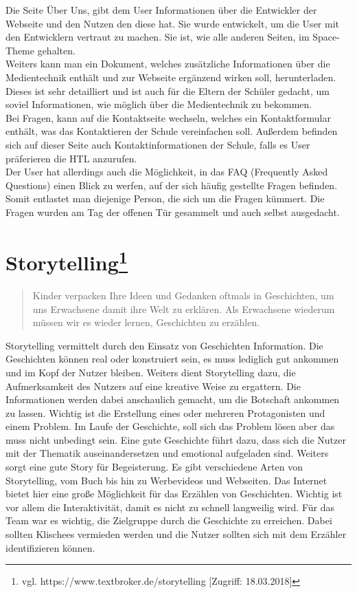 Die Seite Über Uns, gibt dem User Informationen über die Entwickler der Webseite und den Nutzen den diese hat. Sie wurde entwickelt, um die User mit den Entwicklern vertraut zu machen. Sie ist, wie alle anderen Seiten, im Space-Theme gehalten. 
\\

Weiters kann man ein Dokument, welches zusätzliche Informationen über die Medientechnik enthält und zur Webseite ergänzend wirken soll, herunterladen. Dieses ist sehr detailliert und ist auch für die Eltern der Schüler gedacht, um soviel Informationen, wie möglich über die Medientechnik zu bekommen. 
\\
Bei Fragen, kann auf die Kontaktseite wechseln, welches ein Kontaktformular enthält, was das Kontaktieren der Schule vereinfachen soll. Außerdem befinden sich auf dieser Seite auch Kontaktinformationen der Schule, falls es User präferieren die HTL anzurufen.\\

Der User hat allerdings auch die Möglichkeit, in das FAQ (Frequently Asked Questions) einen Blick zu werfen, auf der sich häufig gestellte Fragen befinden. Somit entlastet man diejenige Person, die sich um die Fragen kümmert. Die Fragen wurden am Tag der offenen Tür gesammelt und auch selbst ausgedacht. 


\section[Storytelling]{Storytelling\protect\footnote{\label{foot:2}vgl. https://www.textbroker.de/storytelling [Zugriff: 18.03.2018]}}

\begin{quote}
Kinder verpacken Ihre Ideen und Gedanken oftmals in Geschichten, um uns Erwachsene damit ihre Welt zu erklären. Als Erwachsene wiederum müssen wir es wieder lernen, Geschichten zu erzählen.
\end{quote}
Storytelling vermittelt durch den Einsatz von Geschichten Information. Die Geschichten können real oder konstruiert sein, es muss lediglich gut ankommen und im Kopf der Nutzer bleiben. Weiters dient Storytelling dazu, die Aufmerksamkeit des Nutzers auf eine kreative Weise zu ergattern. Die Informationen werden dabei anschaulich gemacht, um die Botschaft ankommen zu lassen. Wichtig ist die Erstellung eines oder mehreren Protagonisten und einem Problem. Im Laufe der Geschichte, soll sich das Problem lösen aber das muss nicht unbedingt sein. Eine gute Geschichte führt dazu, dass sich die Nutzer mit der Thematik auseinandersetzen und emotional aufgeladen sind. Weiters sorgt eine gute Story für Begeisterung. Es gibt verschiedene Arten von Storytelling, vom Buch bis hin zu Werbevideos und Webseiten. Das Internet bietet hier eine große Möglichkeit für das Erzählen von Geschichten. Wichtig ist vor allem die Interaktivität, damit es nicht zu schnell langweilig wird.  Für das Team war es wichtig, die Zielgruppe durch die Geschichte zu erreichen. Dabei sollten Klischees vermieden werden und die Nutzer sollten sich mit dem Erzähler identifizieren können. 

